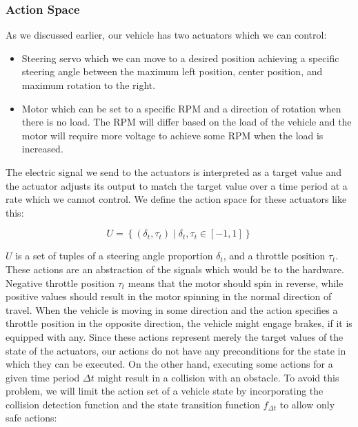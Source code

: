 \subsubsection{Action Space}

As we discussed earlier, our vehicle has two actuators which we can control:
\begin{itemize}
	\item Steering servo which we can move to a desired position achieving a specific steering angle between the maximum left position, center position, and maximum rotation to the right.
	
	\item Motor which can be set to a specific \gls{RPM} and a direction of rotation when there is no load. The \gls*{RPM} will differ based on the load of the vehicle and the motor will require more voltage to achieve some RPM when the load is increased.
\end{itemize}

The electric signal we send to the actuators is interpreted as a target value and the actuator adjusts its output to match the target value over a time period at a rate which we cannot control. We define the action space for these actuators like this:

\[
	U=\left\{ \left( \delta_t,\tau_t\right) \mid \delta_t,\tau_t\in\left[-1, 1\right] \right\}
\]

$U$ is a set of tuples of a steering angle proportion $\delta_t$, and a throttle position $\tau_t$. These actions are an abstraction of the signals which would be to the hardware. Negative throttle position $\tau_t$ means that the motor should spin in reverse, while positive values should result in the motor spinning in the normal direction of travel. When the vehicle is moving in some direction and the action specifies a throttle position in the opposite direction, the vehicle might engage brakes, if it is equipped with any. Since these actions represent merely the target values of the state of the actuators, our actions do not have any preconditions for the state in which they can be executed. On the other hand, executing some actions for a given time period $\Delta t$ might result in a collision with an obstacle. To avoid this problem, we will limit the action set of a vehicle state by incorporating the collision detection function and the state transition function $f_{\Delta t}$ to allow only safe actions:


